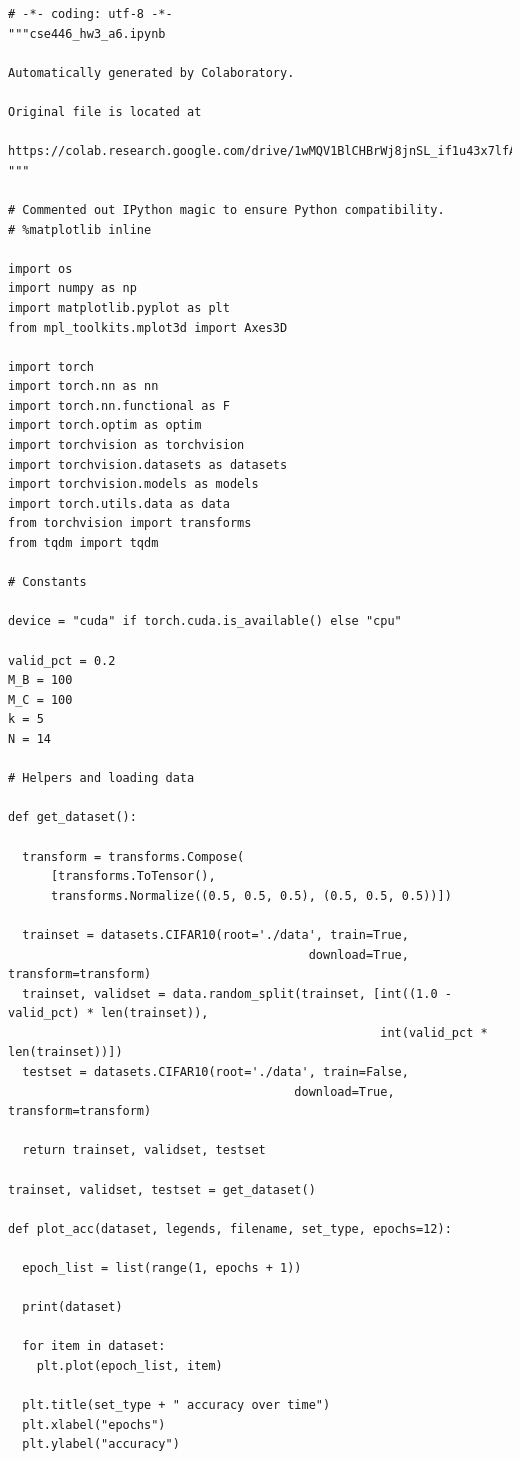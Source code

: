 \documentclass{article}
\newcommand{\1}{\mathbf{1}}
\begin{document}
{\newpage

\begin{verbatim}
# -*- coding: utf-8 -*-
"""cse446_hw3_a6.ipynb

Automatically generated by Colaboratory.

Original file is located at
    https://colab.research.google.com/drive/1wMQV1BlCHBrWj8jnSL_if1u43x7lfAIO
"""

# Commented out IPython magic to ensure Python compatibility.
# %matplotlib inline

import os
import numpy as np
import matplotlib.pyplot as plt
from mpl_toolkits.mplot3d import Axes3D

import torch
import torch.nn as nn
import torch.nn.functional as F
import torch.optim as optim
import torchvision as torchvision
import torchvision.datasets as datasets
import torchvision.models as models
import torch.utils.data as data
from torchvision import transforms
from tqdm import tqdm

# Constants 

device = "cuda" if torch.cuda.is_available() else "cpu"

valid_pct = 0.2
M_B = 100
M_C = 100
k = 5
N = 14

# Helpers and loading data

def get_dataset():

  transform = transforms.Compose(
      [transforms.ToTensor(),
      transforms.Normalize((0.5, 0.5, 0.5), (0.5, 0.5, 0.5))])

  trainset = datasets.CIFAR10(root='./data', train=True,
                                          download=True, transform=transform)
  trainset, validset = data.random_split(trainset, [int((1.0 - valid_pct) * len(trainset)),
                                                    int(valid_pct * len(trainset))])
  testset = datasets.CIFAR10(root='./data', train=False,
                                        download=True, transform=transform)

  return trainset, validset, testset

trainset, validset, testset = get_dataset()

def plot_acc(dataset, legends, filename, set_type, epochs=12):

  epoch_list = list(range(1, epochs + 1))

  print(dataset)

  for item in dataset:
    plt.plot(epoch_list, item)

  plt.title(set_type + " accuracy over time")
  plt.xlabel("epochs")
  plt.ylabel("accuracy")
  

\end{verbatim}}
\end{document}
